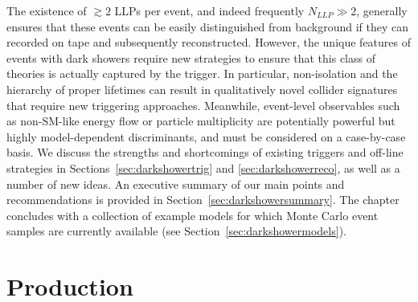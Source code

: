 The existence of $\gtrsim 2$ LLPs per event, and indeed frequently $N_{LLP}\gg 2$, generally ensures that these events can be easily distinguished from background if they can recorded on tape and subsequently reconstructed. However, the unique features of events with dark showers require new strategies to ensure that this class of theories is actually captured by the trigger. In particular, non-isolation and the hierarchy of proper lifetimes can result in qualitatively novel collider signatures that require new triggering approaches. Meanwhile, event-level observables such as non-SM-like energy flow or particle multiplicity are potentially powerful but highly model-dependent discriminants, and must be considered on a case-by-case basis. We discuss the strengths and shortcomings of existing triggers and off-line strategies in Sections~\ref{sec:darkshowertrig} and \ref{sec:darkshowerreco}, as well as a number of new ideas. An executive summary of our main points and recommendations is provided in Section~\ref{sec:darkshowersummary}. The chapter concludes with a collection of example models for which Monte Carlo event samples are currently available (see Section~\ref{sec:darkshowermodels}).

\section{Production}
\label{sec:darkshowerprod}


